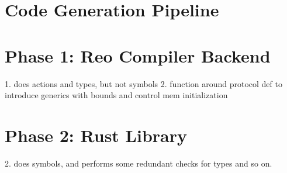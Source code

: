 \section{Code Generation Pipeline}
\section{Phase 1: Reo Compiler Backend}
1. does actions and types, but not symbols
2. function around protocol def to introduce generics with bounds and control mem initialization

\section{Phase 2: Rust Library}
2. does symbols, and performs some redundant checks for types and so on.
